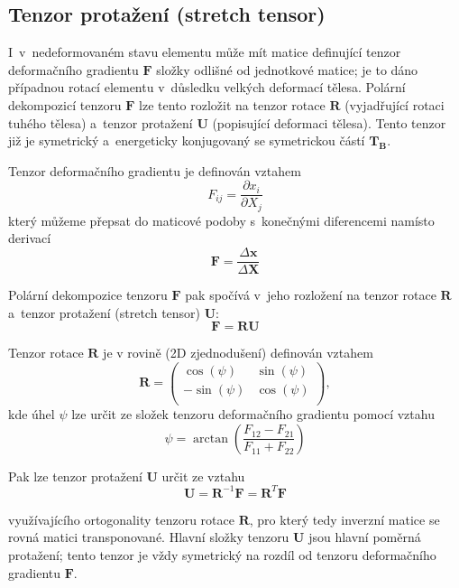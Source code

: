 
\subsection{Tenzor protažení (stretch tensor)}
I~v~nedeformovaném stavu elementu může mít matice definující tenzor deformačního gradientu $\bm{F}$ složky odlišné od jednotkové matice; je to dáno případnou rotací elementu v~důsledku velkých deformací tělesa.  Polární dekompozicí tenzoru $\bm{F}$ lze tento rozložit na tenzor rotace $\bm{R}$ (vyjadřující rotaci tuhého tělesa) a~tenzor protažení $\bm{U}$ (popisující deformaci tělesa). Tento tenzor již je symetrický a~energeticky konjugovaný se symetrickou částí $\bm{T_B}$.

Tenzor deformačního gradientu je definován vztahem
\begin{equation}
	F_{ij} = \frac{\partial x_i}{\partial X_j}
\end{equation}
který můžeme přepsat do maticové podoby s~konečnými diferencemi namísto derivací
\begin{equation}
	\bm{F} = \frac{\Delta \bm{x}}{\Delta \bm{X}}
\end{equation}

Polární dekompozice tenzoru $\bm{F}$ pak spočívá v~jeho rozložení na tenzor 
rotace $\bm{R}$ a~tenzor protažení (stretch tensor) $\bm{U}$:
\begin{equation}
	\bm{F} = \bm{R} \bm{U}
\end{equation}

Tenzor rotace $\bm{R}$ je v rovině (2D zjednodušení) definován vztahem
\begin{equation}
	\bm{R} = \left(\begin{matrix}
		\cos(\psi) & \sin(\psi)\\
		-\sin(\psi) & \cos(\psi)\\
	\end{matrix}\right),
\end{equation}
kde úhel $\psi$ lze určit ze složek tenzoru deformačního gradientu pomocí vztahu
\begin{equation}
	\psi = \arctan\left(\frac{F_{12} - F_{21}}{F_{11} + F_{22}}\right)
\end{equation}

Pak lze tenzor protažení $\bm{U}$ určit ze vztahu
\begin{equation}
	\bm{U} = \bm{R}^{-1} \bm{F} = \bm{R}^T \bm{F}
\end{equation}

využívajícího ortogonality tenzoru rotace $\bm{R}$, pro který tedy inverzní matice se rovná matici transponované. Hlavní složky tenzoru $\bm{U}$ jsou hlavní poměrná protažení; tento tenzor je vždy symetrický na rozdíl od tenzoru deformačního gradientu $\bm{F}$.
